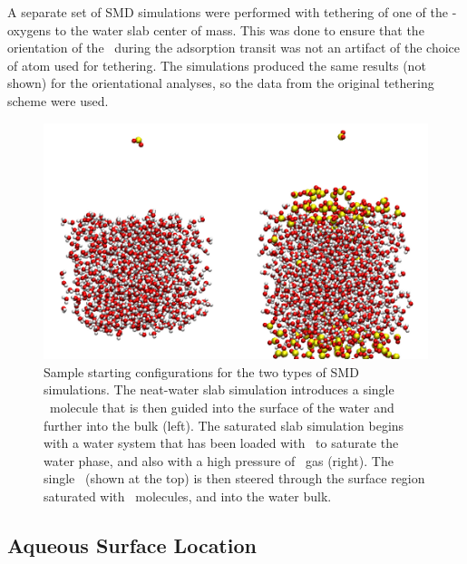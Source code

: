 A separate set of SMD simulations were performed with tethering of one of the \suldiox-oxygens to the water slab center of mass. This was done to ensure that the orientation of the \suldiox~during the adsorption transit was not an artifact of the choice of atom used for tethering. The simulations produced the same results (not shown) for the orientational analyses, so the data from the original tethering scheme were used.

\begin{figure}[h!]
	\begin{center}
		\includegraphics[scale=1.0]{images/startingconfigurations.png}
		\caption{Sample starting configurations for the two types of SMD simulations. The neat-water slab simulation introduces a single \suldiox~molecule that is then guided into the surface of the water and further into the bulk (left). The saturated slab simulation begins with a water system that has been loaded with \suldiox~to saturate the water phase, and also with a high pressure of \suldiox~gas (right). The single \suldiox~(shown at the top) is then steered through the surface region saturated with \suldiox~molecules, and into the water bulk.}
		\label{fig:starting-configurations}
	\end{center}
\end{figure}

\subsection {Aqueous Surface Location}


